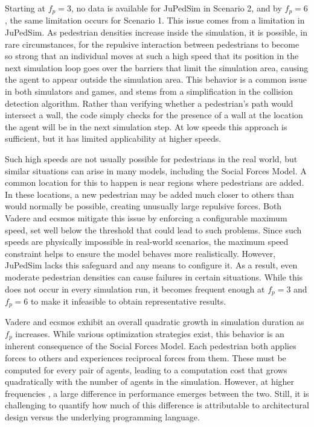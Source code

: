 \documentclass[twoside, 11pt]{article}
\begin{document}
Starting at $f_p = 3$, no data is available for JuPedSim in Scenario 2, and by $f_p = 6$, the same limitation occurs for Scenario 1. This issue comes from a limitation in JuPedSim. As pedestrian densities increase inside the simulation, it is possible, in rare circumstances, for the repulsive interaction between pedestrians to become so strong that an individual moves at such a high speed that its position in the next simulation loop goes over the barriers that limit the simulation area, causing the agent to appear outside the simulation area. This behavior is a common issue in both simulators and games, and stems from a simplification in the collision detection algorithm. Rather than verifying whether a pedestrian's path would intersect a wall, the code simply checks for the presence of a wall at the location the agent will be in the next simulation step. At low speeds this approach is sufficient, but it has limited applicability at higher speeds.

Such high speeds are not usually possible for pedestrians in the real world, but similar situations can arise in many models, including the Social Forces Model. A common location for this to happen is near regions where pedestrians are added. In these locations, a new pedestrian may be added much closer to others than would normally be possible, creating unusually large repulsive forces. Both Vadere and \gls{ecsmos} mitigate this issue by enforcing a configurable maximum speed, set well below the threshold that could lead to such problems. Since such speeds are physically impossible in real-world scenarios, the maximum speed constraint helps to ensure the model behaves more realistically. However, JuPedSim lacks this safeguard and any means to configure it. As a result, even moderate pedestrian densities can cause failures in certain situations. While this does not occur in every simulation run, it becomes frequent enough at $f_p = 3$ and $f_p = 6$ to make it infeasible to obtain representative results.

Vadere and \gls{ecsmos} exhibit an overall quadratic growth in simulation duration as $f_p$ increases. While various optimization strategies exist, this behavior is an inherent consequence of the Social Forces Model. Each pedestrian both applies forces to others and experiences reciprocal forces from them. These must be computed for every pair of agents, leading to a computation cost that grows quadratically with the number of agents in the simulation. However, at higher frequencies , a large difference in performance emerges between the two. Still, it is challenging to quantify how much of this difference is attributable to architectural design versus the underlying programming language.
\end{document}
